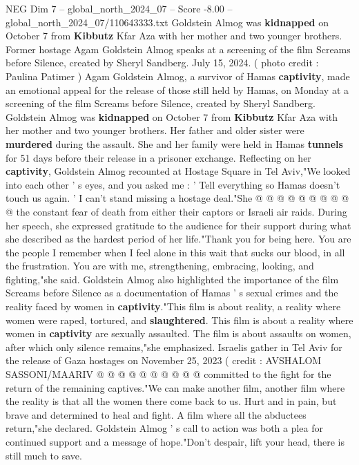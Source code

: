 \begin{textsample}{NEG Dim 7 – global\_north\_2024\_07 – Score -8.00 – global\_north\_2024\_07/110643333.txt}  \label{ex:f7_neg_114}
Goldstein Almog was \textbf{kidnapped} on October 7 from \textbf{Kibbutz} Kfar Aza with her mother and two younger brothers.
Former hostage Agam Goldstein Almog speaks at a screening of the film Screams before Silence, created by Sheryl Sandberg.
July 15, 2024. ( photo credit : Paulina Patimer ) Agam Goldstein Almog, a survivor of Hamas \textbf{captivity}, made an emotional appeal for the release of those still held by Hamas, on Monday at a screening of the film Screams before Silence, created by Sheryl Sandberg.
Goldstein Almog was \textbf{kidnapped} on October 7 from \textbf{Kibbutz} Kfar Aza with her mother and two younger brothers.
Her father and older sister were \textbf{murdered} during the assault.
She and her family were held in Hamas \textbf{tunnels} for 51 days before their release in a prisoner exchange.
Reflecting on her \textbf{captivity}, Goldstein Almog recounted at Hostage Square in Tel Aviv,"We looked into each other ' s eyes, and you asked me : ' Tell everything so Hamas doesn't touch us again. ' I can't stand missing a hostage deal."She @ @ @ @ @ @ @ @ @ @ the constant fear of death from either their captors or Israeli air raids.
During her speech, she expressed gratitude to the audience for their support during what she described as the hardest period of her life."Thank you for being here.
You are the people I remember when I feel alone in this wait that sucks our blood, in all the frustration.
You are with me, strengthening, embracing, looking, and fighting,"she said.
Goldstein Almog also highlighted the importance of the film Screams before Silence as a documentation of Hamas ' s sexual crimes and the reality faced by women in \textbf{captivity}."This film is about reality, a reality where women were raped, tortured, and \textbf{slaughtered}.
This film is about a reality where women in \textbf{captivity} are sexually assaulted.
The film is about assaults on women, after which only silence remains,"she emphasized.
Israelis gather in Tel Aviv for the release of Gaza hostages on November 25, 2023 ( credit : AVSHALOM SASSONI/MAARIV @ @ @ @ @ @ @ @ @ @ committed to the fight for the return of the remaining captives."We can make another film, another film where the reality is that all the women there come back to us.
Hurt and in pain, but brave and determined to heal and fight.
A film where all the abductees return,"she declared.
Goldstein Almog ' s call to action was both a plea for continued support and a message of hope."Don't despair, lift your head, there is still much to save.

\end{textsample}
